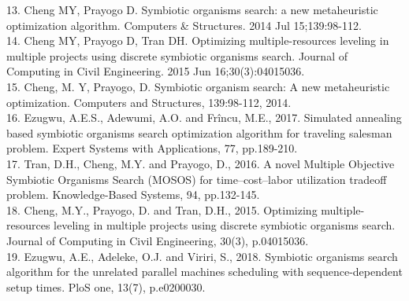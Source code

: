 \documentclass{article}
\begin{document}
13.	Cheng MY, Prayogo D. Symbiotic organisms search: a new metaheuristic optimization algorithm. Computers & Structures. 2014 Jul 15;139:98-112.\\
14.	Cheng MY, Prayogo D, Tran DH. Optimizing multiple-resources leveling in multiple projects using discrete symbiotic organisms search. Journal of Computing in Civil Engineering. 2015 Jun 16;30(3):04015036.\\
15.	Cheng, M. Y, Prayogo, D. Symbiotic organism search: A new metaheuristic optimization. Computers and Structures, 139:98-112, 2014.\\
16.	Ezugwu, A.E.S., Adewumi, A.O. and Frîncu, M.E., 2017. Simulated annealing based symbiotic organisms search optimization algorithm for traveling salesman problem. Expert Systems with Applications, 77, pp.189-210.\\
17.	Tran, D.H., Cheng, M.Y. and Prayogo, D., 2016. A novel Multiple Objective Symbiotic Organisms Search (MOSOS) for time–cost–labor utilization tradeoff problem. Knowledge-Based Systems, 94, pp.132-145.\\
18.	Cheng, M.Y., Prayogo, D. and Tran, D.H., 2015. Optimizing multiple-resources leveling in multiple projects using discrete symbiotic organisms search. Journal of Computing in Civil Engineering, 30(3), p.04015036.\\
19.	Ezugwu, A.E., Adeleke, O.J. and Viriri, S., 2018. Symbiotic organisms search algorithm for the unrelated parallel machines scheduling with sequence-dependent setup times. PloS one, 13(7), p.e0200030.\\
\end{document}

